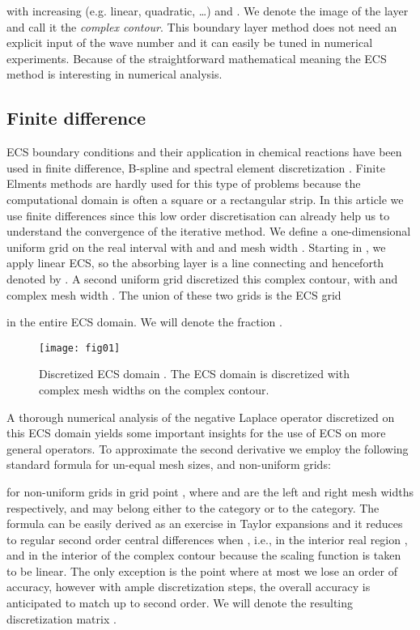 \documentclass[mathpazo]{cicp}
\theoremstyle{definition}
\numberwithin{equation}{section}
\providecommand{\wv}{}
\providecommand{\hbz}{}
\providecommand{\edt}{}
\begin{document}
with  increasing (e.g. linear, quadratic, \ldots) and . We
denote the image of the layer  and call it the \emph{complex contour}. This boundary layer method does not need an explicit input of the wave number and it can easily be tuned in numerical experiments. Because of the straightforward mathematical meaning the ECS method is interesting in numerical analysis.

\subsection{Finite difference }
ECS boundary conditions and their application in chemical reactions
have been used in finite difference, B-spline and spectral element
discretization \cite{mccurdyTR2004}. \wv{Finite Elments methods are
  hardly used for this type of problems because the computational
  domain is often a square or a rectangular strip.} In this article we
use finite differences \wv{since this low order discretisation can
  already help us to understand the convergence of the iterative
  method.} We define a one-dimensional uniform grid  on the real interval  with  and 
and mesh width . Starting in , we apply
linear ECS, so the absorbing layer is a line connecting  and
 henceforth denoted by . A second uniform
grid  discretized this complex contour, with
 and complex mesh width . The
union of these two grids is the ECS grid

in the entire ECS domain. We will denote the fraction .
\begin{figure}[htbp!]
\begin{center}
\texttt{[image: fig01]}\caption{Discretized ECS domain . The ECS domain is discretized with complex mesh widths on the complex contour.}\label{fig:disecs}
\end{center}
\end{figure}

A thorough numerical analysis of the negative Laplace operator  discretized on this ECS domain yields some important insights for the use of ECS on more general operators. To approximate the second derivative we \hbz{employ the following standard formula for un-equal mesh sizes, and non-uniform grids:}

for non-uniform grids in grid point , where  and  are the left and right mesh widths respectively, and may belong either to the  category or to the  category. \wv{The formula can be easily derived as \edt{an} exercise in Taylor expansions} and it reduces to regular second order central differences when , i.e., in the interior real region , and in the interior of the complex contour  because the scaling function  is taken to be linear. The only exception is the point  where at most we lose an order of accuracy, however with ample discretization steps, the overall accuracy is anticipated to match up to second order. We will denote the resulting discretization matrix .
\end{document}
